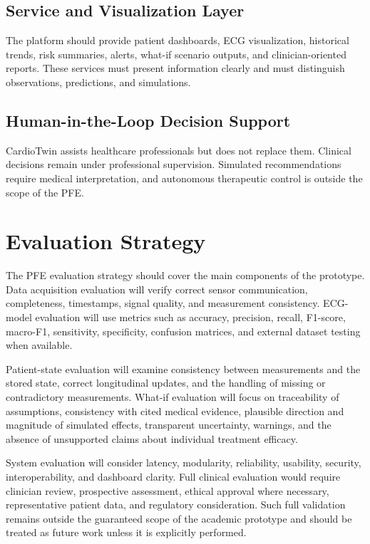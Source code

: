 \subsection{Service and Visualization Layer}
The platform should provide patient dashboards, ECG visualization, historical trends, risk summaries, alerts, what-if scenario outputs, and clinician-oriented reports. These services must present information clearly and must distinguish observations, predictions, and simulations.

\subsection{Human-in-the-Loop Decision Support}
CardioTwin assists healthcare professionals but does not replace them. Clinical decisions remain under professional supervision. Simulated recommendations require medical interpretation, and autonomous therapeutic control is outside the scope of the PFE.

\section{Evaluation Strategy}
The PFE evaluation strategy should cover the main components of the prototype. Data acquisition evaluation will verify correct sensor communication, completeness, timestamps, signal quality, and measurement consistency. ECG-model evaluation will use metrics such as accuracy, precision, recall, F1-score, macro-F1, sensitivity, specificity, confusion matrices, and external dataset testing when available.

Patient-state evaluation will examine consistency between measurements and the stored state, correct longitudinal updates, and the handling of missing or contradictory measurements. What-if evaluation will focus on traceability of assumptions, consistency with cited medical evidence, plausible direction and magnitude of simulated effects, transparent uncertainty, warnings, and the absence of unsupported claims about individual treatment efficacy.

System evaluation will consider latency, modularity, reliability, usability, security, interoperability, and dashboard clarity. Full clinical evaluation would require clinician review, prospective assessment, ethical approval where necessary, representative patient data, and regulatory consideration. Such full validation remains outside the guaranteed scope of the academic prototype and should be treated as future work unless it is explicitly performed.

